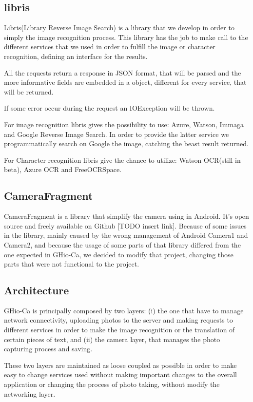 \subsection{libris}
Libris(Library Reverse Image Search) is a library that we develop in order to 
simply the image recognition process. This library has the job to make call to 
the different services that we used in order to fulfill the image or character 
recognition, defining an interface for the results.

All the requests return a response in JSON format, that will be parsed and the 
more informative fields are embedded in a object, different for every service, 
that will be returned. 

If some error occur during the request an IOException will be thrown.

For image recognition libris gives the possibility to use: Azure, Watson, Immaga 
and Google Reverse Image Search. In order to provide the latter service we 
programmatically search on Google the image, catching the beast result returned.

For Character recognition libris give the chance to utilize: Watson OCR(still in 
beta), Azure OCR and FreeOCRSpace.

\subsection{CameraFragment}
CameraFragment is a library that simplify the camera using in Android. It's 
open source and freely available on Github [TODO insert link]. Because of some
issues in the library, mainly caused by the wrong management of Android Camera1 
and Camera2, and because the usage of some parts of that library differed from 
the one expected in GHio-Ca, we decided to modify that project, changing those 
parts that were not functional to the project.

\subsection{Architecture}
GHio-Ca is principally composed by two layers: (i) the one that have to manage
network connectivity, uploading photos to the server and making requests to 
different services in order to make the image recognition or the translation of 
certain pieces of text, and (ii) the camera layer, that manages the photo 
capturing process and saving. 

These two layers are maintained as loose coupled as possible in order to make 
easy to change services used without making important changes to the overall 
application or changing the process of photo taking, without modify the 
networking layer.

